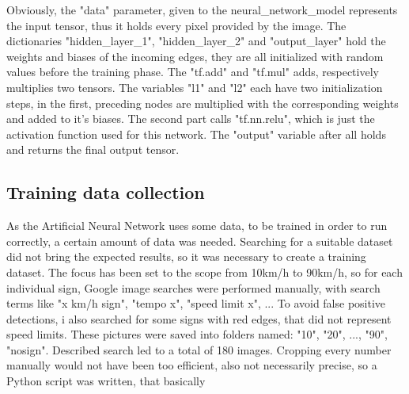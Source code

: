 Obviously, the "data" parameter, given to the neural\_network\_model represents the input tensor, thus it holds every pixel provided by the image. The dictionaries "hidden\_layer\_1", "hidden\_layer\_2" and "output\_layer" hold the weights and biases of the incoming edges, they are all initialized with random values before the training phase. The "tf.add" and "tf.mul" adds, respectively multiplies two tensors. The variables "l1" and "l2" each have two initialization steps, in the first, preceding nodes are multiplied with the corresponding weights and added to it's biases. The second part calls "tf.nn.relu", which is just the activation function used for this network. The "output" variable after all holds and returns the final output tensor. 

\subsection{Training data collection}
As the Artificial Neural Network uses some data, to be trained in order to run correctly, a certain amount of data was needed. Searching for a suitable dataset did not bring the expected results, so it was necessary to create a training dataset. The focus has been set to the scope from 10km/h to 90km/h, so for each individual sign, Google image searches were performed manually, with search terms like "x km/h sign", "tempo x", "speed limit x", ...  To avoid false positive detections, i also searched for some signs with red edges, that did not represent speed limits. These pictures were saved into folders named: "10", "20", ..., "90", "nosign". Described search led to a total of 180 images. Cropping every number manually would not have been too efficient, also not necessarily precise, so a Python script was written, that basically 